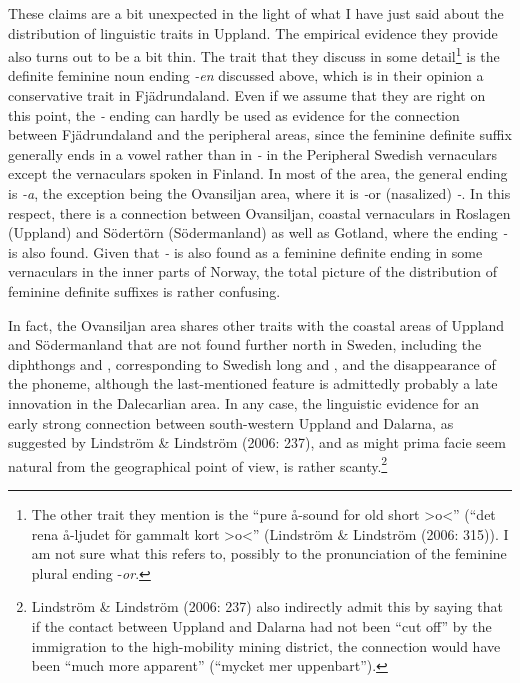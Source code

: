 These claims are a bit unexpected in the light of what I have just said about the distribution of linguistic traits in Uppland. The empirical evidence they provide also turns out to be a bit thin. The trait that they discuss in some detail\footnote{ The other trait they mention is the “pure å-sound for old short {\textgreater}o{\textless}” (“det rena å-ljudet för gammalt kort {\textgreater}o{\textless}” (Lindström \& Lindström (2006: 315)). I am not sure what this refers to, possibly to the pronunciation of the feminine plural ending -\textit{o}\textit{r}.} is the definite feminine noun ending \textit{{}-en} discussed above, which is in their opinion a conservative trait in Fjädrundaland. Even if we assume that they are right on this point, the\textit{ {}-} ending can hardly be used as evidence for the connection between Fjädrundaland and the peripheral areas, since the feminine definite suffix generally ends in a vowel rather than in\textit{ {}-} in the Peripheral Swedish vernaculars except the vernaculars spoken in Finland.  In most of the area, the general ending is\textit{ {}-a}, the exception being the Ovansiljan area, where it is\textit{ {}-}or (nasalized)\textit{ {}-}. In this respect, there is a connection between Ovansiljan, coastal vernaculars in Roslagen (Uppland) and Södertörn (Södermanland) as well as Gotland, where the ending\textit{ {}-} is also found. Given that\textit{ {}-} is also found as a feminine definite ending in some vernaculars in the inner parts of Norway, the total picture of the distribution of feminine definite suffixes is rather confusing. 




In fact, the Ovansiljan area shares other traits with the coastal areas of Uppland and Södermanland that are not found further north in Sweden, including the diphthongs  and , corresponding to Swedish long  and , and the disappearance of the  phoneme, although the last-mentioned feature is admittedly probably a late innovation in the Dalecarlian area. In any case, the linguistic evidence for an early strong connection between south-western Uppland and Dalarna, as suggested by Lindström \& Lindström (2006: 237), and as might prima facie seem natural from the geographical point of view, is rather scanty.\footnote{ Lindström \& Lindström (2006: 237) also indirectly admit this by saying that if the contact between Uppland and Dalarna had not been “cut off” by the immigration to the high-mobility mining district, the connection would have been “much more apparent” (“mycket mer uppenbart”).}


